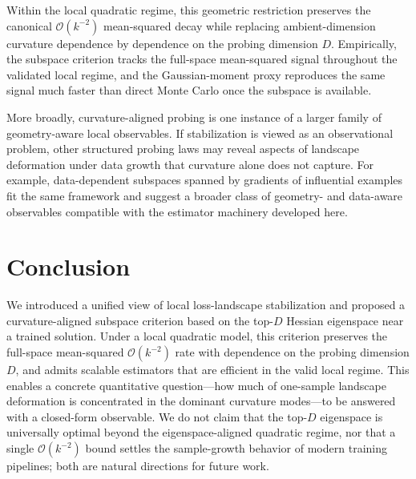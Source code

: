 \documentclass{article}
\begin{document}
Within the local quadratic regime, this geometric restriction preserves the canonical $\mathcal O(k^{-2})$ mean-squared decay while replacing ambient-dimension curvature dependence by dependence on the probing dimension $D$. Empirically, the subspace criterion tracks the full-space mean-squared signal throughout the validated local regime, and the Gaussian-moment proxy reproduces the same signal much faster than direct Monte Carlo once the subspace is available.

More broadly, curvature-aligned probing is one instance of a larger family of geometry-aware local observables. If stabilization is viewed as an observational problem, other structured probing laws may reveal aspects of landscape deformation under data growth that curvature alone does not capture. For example, data-dependent subspaces spanned by gradients of influential examples fit the same framework and suggest a broader class of geometry- and data-aware observables compatible with the estimator machinery developed here.

\section{Conclusion}
\label{sec:conclusion}

We introduced a unified view of local loss-landscape stabilization and proposed a curvature-aligned subspace criterion based on the top-$D$ Hessian eigenspace near a trained solution. Under a local quadratic model, this criterion preserves the full-space mean-squared $\mathcal O(k^{-2})$ rate with dependence on the probing dimension $D$, and admits scalable estimators that are efficient in the valid local regime. This enables a concrete quantitative question---how much of one-sample landscape deformation is concentrated in the dominant curvature modes---to be answered with a closed-form observable. We do not claim that the top-$D$ eigenspace is universally optimal beyond the eigenspace-aligned quadratic regime, nor that a single $\mathcal O(k^{-2})$ bound settles the sample-growth behavior of modern training pipelines; both are natural directions for future work.









\appendix
\end{document}

